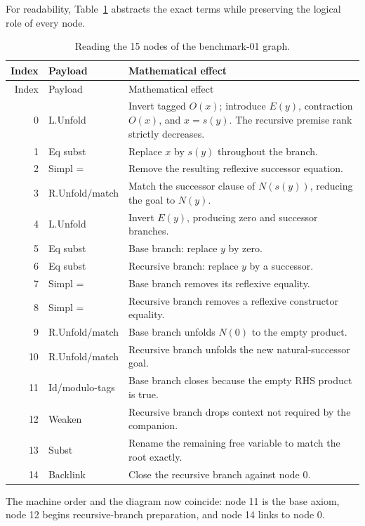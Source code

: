 \documentclass[11pt,oneside]{book}
\begin{document}
For readability, Table~\ref{tab:b01nodes} abstracts the exact terms while
preserving the logical role of every node.
\begin{longtable}{@{}r p{}p{}@{}}
\caption{Reading the 15 nodes of the benchmark-01 graph.}
\label{tab:b01nodes}\\
\toprule
Index & Payload & Mathematical effect\\
\midrule
\endfirsthead
\toprule
Index & Payload & Mathematical effect\\
\midrule
\endhead
0 & L.Unfold & Invert tagged \(O(x)\); introduce \(E(y)\), contraction \(O(x)\), and \(x=s(y)\).  The recursive premise rank strictly decreases.\\
1 & Eq subst & Replace \(x\) by \(s(y)\) throughout the branch.\\
2 & Simpl = & Remove the resulting reflexive successor equation.\\
3 & R.Unfold/match & Match the successor clause of \(N(s(y))\), reducing the goal to \(N(y)\).\\
4 & L.Unfold & Invert \(E(y)\), producing zero and successor branches.\\
5 & Eq subst & Base branch: replace \(y\) by zero.\\
6 & Eq subst & Recursive branch: replace \(y\) by a successor.\\
7 & Simpl = & Base branch removes its reflexive equality.\\
8 & Simpl = & Recursive branch removes a reflexive constructor equality.\\
9 & R.Unfold/match & Base branch unfolds \(N(0)\) to the empty product.\\
10 & R.Unfold/match & Recursive branch unfolds the new natural-successor goal.\\
11 & Id/modulo-tags & Base branch closes because the empty RHS product is true.\\
12 & Weaken & Recursive branch drops context not required by the companion.\\
13 & Subst & Rename the remaining free variable to match the root exactly.\\
14 & Backlink & Close the recursive branch against node 0.\\
\bottomrule
\end{longtable}

The machine order and the diagram now coincide: node 11 is the base axiom,
node 12 begins recursive-branch preparation, and node 14 links to node 0.
\end{document}

